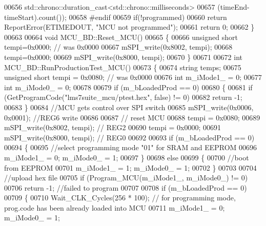 \begin{DoxyCode}
{{{{00656             std::chrono::duration\_cast<std::chrono::milliseconds>
00657             (timeEnd-timeStart).count());
00658 \textcolor{preprocessor}{#endif}
00659     \textcolor{keywordflow}{if}(!programmed)
00660         \textcolor{keywordflow}{return} ReportError(ETIMEDOUT, \textcolor{stringliteral}{"MCU not programmed"});
00661     \textcolor{keywordflow}{return} 0;
00662 \}
00663 
00664 \textcolor{keywordtype}{void} MCU\_BD::Reset\_MCU()
00665 \{
00666     \textcolor{keywordtype}{unsigned} \textcolor{keywordtype}{short} tempi=0x0000;  \textcolor{comment}{// was 0x0000}
00667     mSPI\_write(0x8002, tempi);
00668     tempi=0x0000;
00669     mSPI\_write(0x8000, tempi);
00670 \}
00671 
00672 \textcolor{keywordtype}{int} MCU\_BD::RunProductionTest\_MCU()
00673 \{
00674     \textcolor{keywordtype}{string} temps;
00675     \textcolor{keywordtype}{unsigned} \textcolor{keywordtype}{short} tempi = 0x0080;  \textcolor{comment}{// was 0x0000}
00676     \textcolor{keywordtype}{int} m\_iMode1\_ = 0;
00677     \textcolor{keywordtype}{int} m\_iMode0\_ = 0;
00678 
00679     \textcolor{keywordflow}{if} (m\_bLoadedProd == 0)
00680     \{
00681         \textcolor{keywordflow}{if} (GetProgramCode(\textcolor{stringliteral}{"lms7suite\_mcu/ptest.hex"}, \textcolor{keyword}{false}) != 0)
00682             \textcolor{keywordflow}{return} -1;
00683     \}
00684     \textcolor{comment}{//MCU gets control over SPI switch}
00685     mSPI\_write(0x0006, 0x0001); \textcolor{comment}{//REG6 write}
00686 
00687     \textcolor{comment}{// reset MCU}
00688     tempi = 0x0080;
00689     mSPI\_write(0x8002, tempi); \textcolor{comment}{// REG2}
00690     tempi = 0x0000;
00691     mSPI\_write(0x8000, tempi); \textcolor{comment}{// REG0}
00692 
00693     \textcolor{keywordflow}{if} (m\_bLoadedProd == 0)
00694     \{
00695         \textcolor{comment}{//select programming mode "01" for SRAM and EEPROM}
00696         m\_iMode1\_ = 0; m\_iMode0\_ = 1;
00697     \}
00698     \textcolor{keywordflow}{else}
00699     \{
00700         \textcolor{comment}{//boot from EEPROM}
00701         m\_iMode1\_ = 1; m\_iMode0\_ = 1;
00702     \}
00703 
00704     \textcolor{comment}{//upload hex file}
00705     \textcolor{keywordflow}{if} (Program\_MCU(m\_iMode1\_, m\_iMode0\_) != 0)
00706         \textcolor{keywordflow}{return} -1; \textcolor{comment}{//failed to program}
00707 
00708     \textcolor{keywordflow}{if} (m\_bLoadedProd == 0)
00709     \{
00710         Wait\_CLK\_Cycles(256 * 100);  \textcolor{comment}{// for programming mode, prog.code has been already loaded into MCU}
00711         m\_iMode1\_ = 0; m\_iMode0\_ = 1;
}}}}
\end{DoxyCode}
